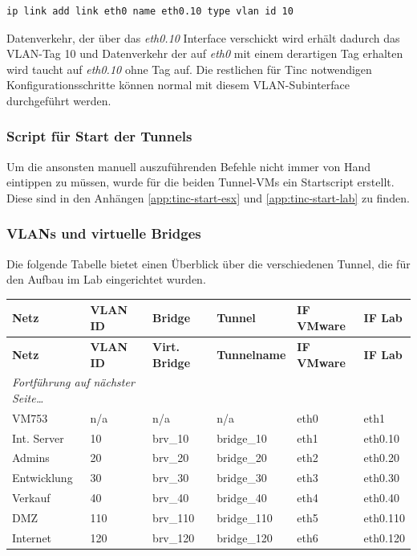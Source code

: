 \begin{lstlisting}
ip link add link eth0 name eth0.10 type vlan id 10
\end{lstlisting}

Datenverkehr, der über das \emph{eth0.10} Interface verschickt wird erhält dadurch das VLAN-Tag 10 und Datenverkehr der auf \emph{eth0} mit einem derartigen Tag erhalten wird taucht auf \emph{eth0.10} ohne Tag auf. Die restlichen für Tinc notwendigen Konfigurationsschritte können normal mit diesem VLAN-Subinterface durchgeführt werden.

\subsubsection{Script für Start der Tunnels}
Um die ansonsten manuell auszuführenden Befehle nicht immer von Hand eintippen zu müssen, wurde für die beiden Tunnel-VMs ein Startscript erstellt. Diese sind in den Anhängen \ref{app:tinc-start-esx} und \ref{app:tinc-start-lab} zu finden.

\subsubsection{VLANs und virtuelle Bridges}
Die folgende Tabelle bietet einen Überblick über die verschiedenen Tunnel, die für den Aufbau im Lab eingerichtet wurden.

\begin{longtable}{p{2.5cm}|p{2cm}|p{1.5cm}|p{2cm}|p{2.5cm}|p{2cm}}
	\textbf{Netz} & \textbf{VLAN ID} & \textbf{Bridge} & \textbf{Tunnel} & \textbf{IF VMware} & \textbf{IF Lab}\\
	\hline
	\endfirsthead
	\textbf{Netz} & \textbf{VLAN ID} & \textbf{Virt. Bridge} & \textbf{Tunnelname} & \textbf{IF VMware} & \textbf{IF Lab}\\
	\hline
	\endhead
	\hline
	\multicolumn{2}{l}{\textit{Fortführung auf nächster Seite\ldots}} \\
	\endfoot
	\endlastfoot
	VM753 & n/a & n/a & n/a & eth0 & eth1 \\
	Int. Server & 10 & brv\_10 & bridge\_10 & eth1 & eth0.10 \\
	Admins & 20 & brv\_20 & bridge\_20 & eth2 & eth0.20 \\
	Entwicklung & 30 & brv\_30 & bridge\_30 & eth3 & eth0.30 \\
	Verkauf & 40 & brv\_40 & bridge\_40 & eth4 & eth0.40 \\
	DMZ & 110 & brv\_110 & bridge\_110 & eth5 & eth0.110 \\
	Internet & 120 & brv\_120 & bridge\_120 & eth6 & eth0.120
\end{longtable}
